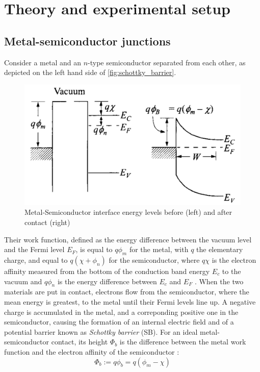 \section{Theory and experimental setup}
\subsection{Metal-semiconductor junctions}
Consider a metal and an $n$-type semiconductor separated from each other, as depicted on the left hand side of \autoref{fig:schottky_barrier}.
\begin{figure}[htbp]
    \centering
    \includegraphics[width=12cm]{figures/schottky_barrier.png}
    \caption{Metal-Semiconductor interface energy levels before (left) and after contact (right) \cite{sze_physics_2007}}
    \label{fig:schottky_barrier}
\end{figure}
Their work function, defined as the energy difference between the vacuum level and the Fermi level $E_F$, is equal to $q \phi_m$ for the metal, with $q$ the elementary charge, and {equal} to $q (\chi + \phi_n)$ for the semiconductor, where $q \chi$ is the electron affinity measured from the bottom of the conduction band {energy} $E_c$ to the vacuum and $q\phi_n$ is the energy difference between $E_c$ and $E_F$ \cite{sze_physics_2007}.
When the two materials are put in contact, electrons flow from the semiconductor, where the mean energy is greatest, to the metal until their Fermi levels line up.
A negative charge is accumulated in the metal, and a correponding positive one in the semiconductor, causing the formation of an internal electric field and of a potential barrier known as \emph{Schottky barrier} (SB).
For an ideal metal-semiconductor contact, its height $\Phi_b$ is the difference between the metal work function and the electron affinity of the semiconductor \cite{sze_physics_2007}:
\begin{equation} \label{eq:barrier_height}
    \Phi_b := q\phi_b = q(\phi_m - \chi)
\end{equation}

